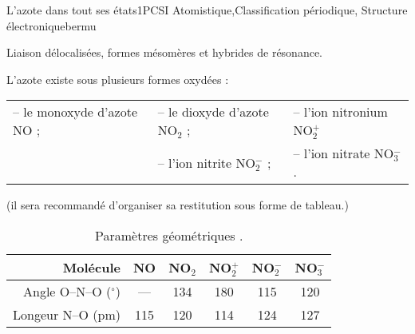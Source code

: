 
\begin{exercise}{L'azote dans tout ses états}{1}{PCSI}
{Atomistique,Classification périodique, Structure électronique}{bermu}


\begin{questions}
    \questioncours Liaison délocalisées, formes mésomères et hybrides de résonance.
    

    \question L'azote existe sous plusieurs formes oxydées : \\
    \begin{tabular}{lll}
        -- le monoxyde d'azote NO ; & -- le dioxyde d'azote NO$_2$ ; & -- l'ion nitronium NO$_2^+$ \\
        & -- l'ion nitrite NO$_2^-$ ;  & -- l'ion nitrate NO$_3^-$.
    \end{tabular}
    
    (il sera recommandé d'organiser sa restitution sous forme de tableau.)
    
    \begin{table}[H]
    \centering
    \begin{tabularx}{.7\linewidth}{r|CCCCC}
        Molécule & NO & NO$_2$ & NO$_2^+$ & NO$_2^-$ & NO$_3^{-}$\\ \hline\hline
        Angle O--N--O ($^\circ$) & --- & 134 & 180 & 115 & 120 \\ 
        Longeur N--O (pm) & 115 & 120 & 114 & 124 & 127 \\ \hline
    \end{tabularx}
    \caption{Paramètres géométriques .}
\end{table}
\end{questions}

\end{exercise}